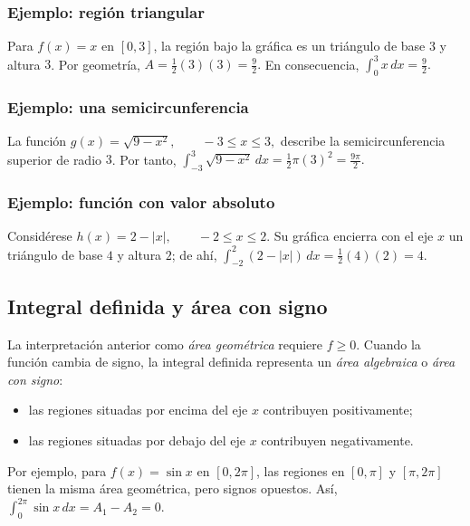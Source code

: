 \documentclass[12pt]{article}
\begin{document}
\subsubsection*{Ejemplo: región triangular}

Para $f(x)=x$ en $[0,3]$, la región bajo la gráfica es un triángulo de base $3$
y altura $3$. Por geometría,
$
A=\frac12(3)(3)=\frac92.
$
En consecuencia,
$
\boxed{\int_0^3 x\,dx=\frac92.}
$

\subsubsection*{Ejemplo: una semicircunferencia}
La función
$
g(x)=\sqrt{9-x^2},\qquad -3\leq x\leq3,
$
describe la semicircunferencia superior de radio $3$. Por tanto,
$
\int_{-3}^{3}\sqrt{9-x^2}\,dx
=\frac12\pi(3)^2
=\boxed{\frac{9\pi}{2}}.
$
\subsubsection*{Ejemplo: función con valor absoluto}
Considérese
$
h(x)=2-|x|,\qquad -2\leq x\leq2.
$
Su gráfica encierra con el eje $x$ un triángulo de base $4$ y altura $2$; de
ahí,
$
\int_{-2}^{2}(2-|x|)\,dx
=\frac12(4)(2)
=\boxed{4}.
$
\subsection*{Integral definida y área con signo}
La interpretación anterior como \emph{área geométrica} requiere $f\geq0$.
Cuando la función cambia de signo, la integral definida representa un
\emph{área algebraica} o \emph{área con signo}:
\begin{itemize}
    \item las regiones situadas por encima del eje $x$ contribuyen positivamente;
    \item las regiones situadas por debajo del eje $x$ contribuyen negativamente.
\end{itemize}

Por ejemplo, para $f(x)=\sin x$ en $[0,2\pi]$, las regiones en $[0,\pi]$ y
$[\pi,2\pi]$ tienen la misma área geométrica, pero signos opuestos. Así,
$
\int_0^{2\pi}\sin x\,dx=A_1-A_2=0.
$
\end{document}
